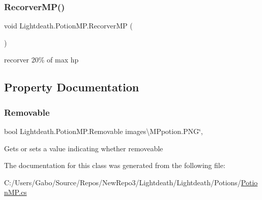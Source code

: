 \subsubsection{\texorpdfstring{Recorver\+M\+P()}{RecorverMP()}}
{\footnotesize\ttfamily void Lightdeath.\+Potion\+M\+P.\+Recorver\+MP (\begin{DoxyParamCaption}{ }\end{DoxyParamCaption})\hspace{0.3cm}{\ttfamily [inline]}}



recorver 20\% of max hp 



\subsection{Property Documentation}
\hypertarget{class_lightdeath_1_1_potion_m_p_adb0339b25613697955d479204c559c36}{}\label{class_lightdeath_1_1_potion_m_p_adb0339b25613697955d479204c559c36} 
\subsubsection{\texorpdfstring{Removable}{Removable}}
{\footnotesize\ttfamily bool Lightdeath.\+Potion\+M\+P.\+Removable images\textbackslash{}\+M\+Ppotion.\+P\+NG\char`\"{}\hspace{0.3cm}{\ttfamily [get]}, {\ttfamily [set]}}



Gets or sets a value indicating whether removeable 



The documentation for this class was generated from the following file\+:\begin{DoxyCompactItemize}
\item 
C\+:/\+Users/\+Gabo/\+Source/\+Repos/\+New\+Repo3/\+Lightdeath/\+Lightdeath/\+Potions/\hyperlink{_potion_m_p_8cs}{Potion\+M\+P.\+cs}\end{DoxyCompactItemize}
